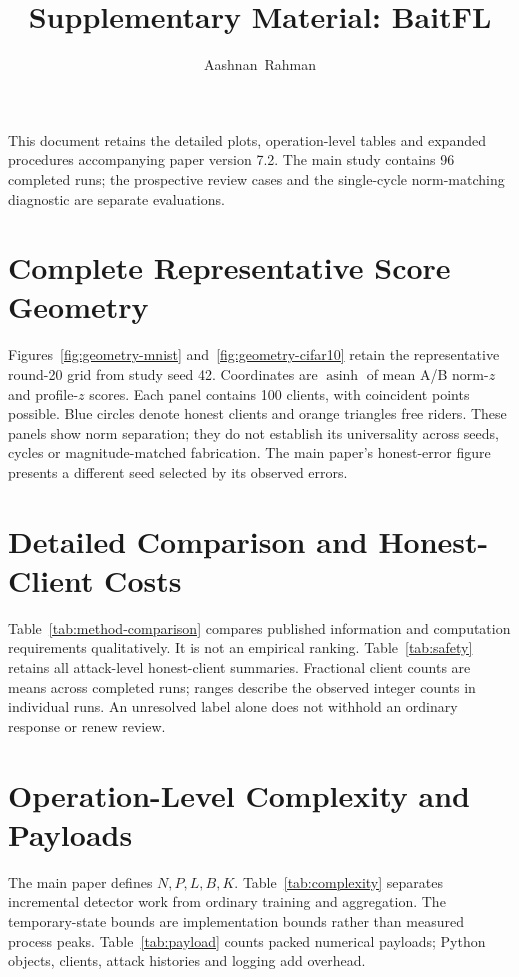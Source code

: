 \documentclass[journal]{IEEEtran}
\title{Supplementary Material: BaitFL}
\author{Aashnan~Rahman}
\begin{document}
\maketitle\raggedbottom
This document retains the detailed plots, operation-level tables and
expanded procedures accompanying paper version 7.2. The main study
contains 96 completed runs; the prospective review cases and the
single-cycle norm-matching diagnostic are separate evaluations.

\section{Complete Representative Score Geometry}
Figures~\ref{fig:geometry-mnist} and~\ref{fig:geometry-cifar10} retain
the representative round-20 grid from study seed 42. Coordinates are
$\operatorname{asinh}$ of mean A/B norm-$z$ and profile-$z$ scores.
Each panel contains 100 clients, with coincident points possible.
Blue circles denote honest clients and orange triangles free riders.
These panels show norm separation; they do not establish its universality
across seeds, cycles or magnitude-matched fabrication. The main paper's
honest-error figure presents a different seed selected by its observed errors.


\FloatBarrier

\section{Detailed Comparison and Honest-Client Costs}
Table~\ref{tab:method-comparison} compares published information and
computation requirements qualitatively. It is not an empirical ranking.
Table~\ref{tab:safety} retains all attack-level honest-client summaries.
Fractional client counts are means across completed runs; ranges describe
the observed integer counts in individual runs. An unresolved label
alone does not withhold an ordinary response or renew review.


\FloatBarrier

\section{Operation-Level Complexity and Payloads}
The main paper defines $N,P,L,B,K$. Table~\ref{tab:complexity} separates
incremental detector work from ordinary training and aggregation.
The temporary-state bounds are implementation bounds rather than measured
process peaks. Table~\ref{tab:payload} counts packed numerical payloads;
Python objects, clients, attack histories and logging add overhead.


\FloatBarrier
\end{document}
